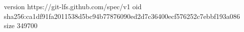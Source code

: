 version https://git-lfs.github.com/spec/v1
oid sha256:ca1df91fa2011538d5bc94b77876090ed2d7c36400ecf576252c7ebbf193a086
size 349700
